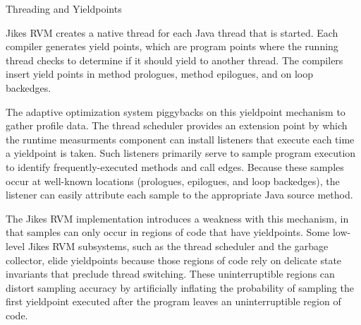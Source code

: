\begin{section}{Threading and Yieldpoints}
\label{sec:threadingandyieldpoints}

Jikes RVM creates a native thread for each Java thread that is started. Each compiler generates yield points, which are program points where the running thread checks to determine if it should yield to another thread. The compilers insert yield points in method prologues, method epilogues, and on loop backedges.

The adaptive optimization system piggybacks on this yieldpoint mechanism to gather profile data. The thread scheduler provides an
extension point by which the runtime measurments component can install listeners that execute each time a yieldpoint is taken. Such listeners primarily serve to sample program execution to identify frequently-executed methods and call edges. Because these samples occur at well-known locations (prologues, epilogues, and loop backedges), the listener can easily attribute each sample to the appropriate Java source method.

The Jikes RVM implementation introduces a weakness with this mechanism, in that samples can only occur in regions of code that have yieldpoints.  Some low-level Jikes RVM subsystems, such as the thread scheduler and the garbage collector, elide yieldpoints because
those regions of code rely on delicate state invariants that preclude thread switching. These uninterruptible regions can distort sampling accuracy by artificially inflating the probability of sampling  the first yieldpoint executed after the program leaves an uninterruptible region of code.

\end{section}
